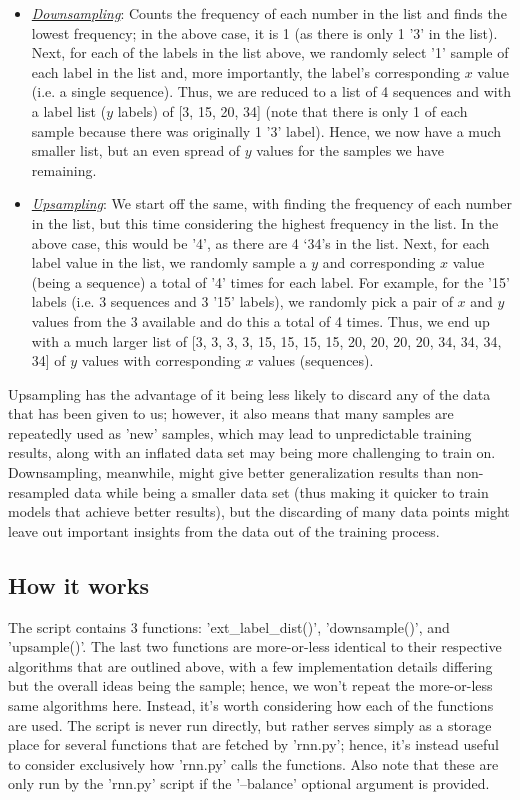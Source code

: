 \documentclass[12pt,twoside]{report}
\begin{document}
\begin{itemize}
	\item \underline{\textit{Downsampling}}: Counts the frequency of each number in the list and finds the lowest frequency; in the above case, it is 1 (as there is only 1 '3' in the list). Next, for each of the labels in the list above, we randomly select '1' sample of each label in the list and, more importantly, the label's corresponding $x$ value (i.e. a single sequence). Thus, we are reduced to a list of 4 sequences and with a label list ($y$ labels) of [3, 15, 20, 34] (note that there is only 1 of each sample because there was originally 1 '3' label). Hence, we now have a much smaller list, but an even spread of $y$ values for the samples we have remaining.
	\item \underline{\textit{Upsampling}}: We start off the same, with finding the frequency of each number in the list, but this time considering the highest frequency in the list. In the above case, this would be '4', as there are 4 ‘34's in the list. Next, for each label value in the list, we randomly sample a $y$ and corresponding $x$ value (being a sequence) a total of '4' times for each label. For example, for the '15' labels (i.e. 3 sequences and 3 '15' labels), we randomly pick a pair of $x$ and $y$ values from the 3 available and do this a total of 4 times. Thus, we end up with a much larger list of [3, 3, 3, 3, 15, 15, 15, 15, 20, 20, 20, 20, 34, 34, 34, 34] of $y$ values with corresponding $x$ values (sequences).
\end{itemize}

\quad Upsampling has the advantage of it being less likely to discard any of the data that has been given to us; however, it also means that many samples are repeatedly used as 'new' samples, which may lead to unpredictable training results, along with an inflated data set may being more challenging to train on. Downsampling, meanwhile, might give better generalization results than non-resampled data while being a smaller data set (thus making it quicker to train models that achieve better results), but the discarding of many data points might leave out important insights from the data out of the training process.

\subsection{How it works}

\quad The script contains 3 functions: 'ext\_label\_dist()', 'downsample()', and 'upsample()'. The last two functions are more-or-less identical to their respective algorithms that are outlined above, with a few implementation details differing but the overall ideas being the sample; hence, we won't repeat the more-or-less same algorithms here. Instead, it's worth considering how each of the functions are used. The script is never run directly, but rather serves simply as a storage place for several functions that are fetched by 'rnn.py'; hence, it's instead useful to consider exclusively how 'rnn.py' calls the functions. Also note that these are only run by the 'rnn.py' script if the '--balance' optional argument is provided.\\
\end{document}
